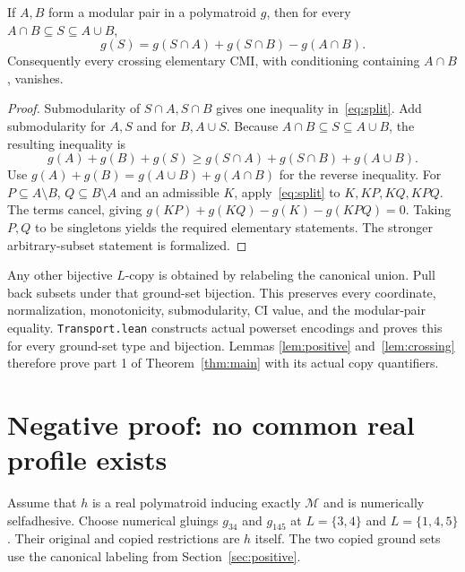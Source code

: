 \documentclass[11pt]{article}
\newcommand{\M}{\mathcal M}\newcommand{\st}{\mathfrak{st}}
\begin{document}
\begin{lemma}\label{lem:crossing}
If $A,B$ form a modular pair in a polymatroid $g$, then for every
$A\cap B\subseteq S\subseteq A\cup B$,
\begin{equation}\label{eq:split}
 g(S)=g(S\cap A)+g(S\cap B)-g(A\cap B).
\end{equation}
Consequently every crossing elementary CMI, with conditioning containing
$A\cap B$, vanishes.
\end{lemma}
\begin{proof}
Submodularity of $S\cap A,S\cap B$ gives one inequality
in~\eqref{eq:split}. Add submodularity for $A,S$ and for $B,A\cup S$.
Because $A\cap B\subseteq S\subseteq A\cup B$, the resulting inequality is
\[
 g(A)+g(B)+g(S)\ge g(S\cap A)+g(S\cap B)+g(A\cup B).
\]
Use $g(A)+g(B)=g(A\cup B)+g(A\cap B)$ for the reverse inequality.
For $P\subseteq A\setminus B$, $Q\subseteq B\setminus A$ and an admissible $K$,
apply~\eqref{eq:split} to $K,KP,KQ,KPQ$. The terms cancel, giving
$g(KP)+g(KQ)-g(K)-g(KPQ)=0$. Taking $P,Q$ to be singletons yields the required
elementary statements. The stronger arbitrary-subset statement is formalized.
\end{proof}
Any other bijective $L$-copy is obtained by relabeling the canonical union.
Pull back subsets under that ground-set bijection. This preserves every
coordinate, normalization, monotonicity, submodularity, CI value, and the
modular-pair equality. \texttt{Transport.lean} constructs actual powerset
encodings and proves this for every ground-set type and bijection. Lemmas
\ref{lem:positive} and~\ref{lem:crossing} therefore prove part 1 of
Theorem~\ref{thm:main} with its actual copy quantifiers.

\section{Negative proof: no common real profile exists}\label{sec:negative}
Assume that $h$ is a real polymatroid inducing exactly $\M$ and is numerically
selfadhesive. Choose numerical gluings $g_{34}$ and $g_{145}$ at $L=\{3,4\}$
and $L=\{1,4,5\}$. Their original and copied restrictions are $h$ itself.
The two copied ground sets use the canonical labeling from
Section~\ref{sec:positive}.
\end{document}
